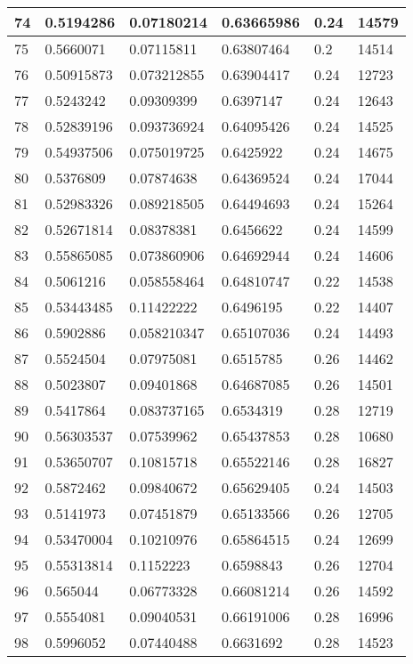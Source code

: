 \begin{longtable}{|l|l|l|l|l|l|}
74 & 0.5194286 & 0.07180214 & 0.63665986 & 0.24 & 14579 \\ \hline 
75 & 0.5660071 & 0.07115811 & 0.63807464 & 0.2 & 14514 \\ \hline 
76 & 0.50915873 & 0.073212855 & 0.63904417 & 0.24 & 12723 \\ \hline 
77 & 0.5243242 & 0.09309399 & 0.6397147 & 0.24 & 12643 \\ \hline 
78 & 0.52839196 & 0.093736924 & 0.64095426 & 0.24 & 14525 \\ \hline 
79 & 0.54937506 & 0.075019725 & 0.6425922 & 0.24 & 14675 \\ \hline 
80 & 0.5376809 & 0.07874638 & 0.64369524 & 0.24 & 17044 \\ \hline 
81 & 0.52983326 & 0.089218505 & 0.64494693 & 0.24 & 15264 \\ \hline 
82 & 0.52671814 & 0.08378381 & 0.6456622 & 0.24 & 14599 \\ \hline 
83 & 0.55865085 & 0.073860906 & 0.64692944 & 0.24 & 14606 \\ \hline 
84 & 0.5061216 & 0.058558464 & 0.64810747 & 0.22 & 14538 \\ \hline 
85 & 0.53443485 & 0.11422222 & 0.6496195 & 0.22 & 14407 \\ \hline 
86 & 0.5902886 & 0.058210347 & 0.65107036 & 0.24 & 14493 \\ \hline 
87 & 0.5524504 & 0.07975081 & 0.6515785 & 0.26 & 14462 \\ \hline 
88 & 0.5023807 & 0.09401868 & 0.64687085 & 0.26 & 14501 \\ \hline 
89 & 0.5417864 & 0.083737165 & 0.6534319 & 0.28 & 12719 \\ \hline 
90 & 0.56303537 & 0.07539962 & 0.65437853 & 0.28 & 10680 \\ \hline 
91 & 0.53650707 & 0.10815718 & 0.65522146 & 0.28 & 16827 \\ \hline 
92 & 0.5872462 & 0.09840672 & 0.65629405 & 0.24 & 14503 \\ \hline 
93 & 0.5141973 & 0.07451879 & 0.65133566 & 0.26 & 12705 \\ \hline 
94 & 0.53470004 & 0.10210976 & 0.65864515 & 0.24 & 12699 \\ \hline 
95 & 0.55313814 & 0.1152223 & 0.6598843 & 0.26 & 12704 \\ \hline 
96 & 0.565044 & 0.06773328 & 0.66081214 & 0.26 & 14592 \\ \hline 
97 & 0.5554081 & 0.09040531 & 0.66191006 & 0.28 & 16996 \\ \hline 
98 & 0.5996052 & 0.07440488 & 0.6631692 & 0.28 & 14523 \\ \hline 

\end{longtable}
